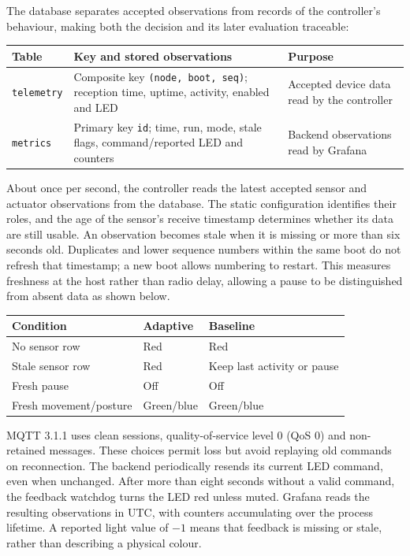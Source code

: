 \documentclass[11pt,a4paper]{article}
\begin{document}
The database separates accepted observations from records of the controller's behaviour, making both the decision and its later evaluation traceable:

{\small
\begin{tabularx}{\linewidth}{@{}lYY@{}}
\toprule
Table & Key and stored observations & Purpose\\
\midrule
\texttt{telemetry} & Composite key \texttt{(node, boot, seq)}; reception time, uptime, activity, enabled and LED & Accepted device data read by the controller\\
\texttt{metrics} & Primary key \texttt{id}; time, run, mode, stale flags, command/reported LED and counters & Backend observations read by Grafana\\
\bottomrule
\end{tabularx}}

About once per second, the controller reads the latest accepted sensor and actuator observations from the database. The static configuration identifies their roles, and the age of the sensor's receive timestamp determines whether its data are still usable. An observation becomes stale when it is missing or more than six seconds old. Duplicates and lower sequence numbers within the same boot do not refresh that timestamp; a new boot allows numbering to restart. This measures freshness at the host rather than radio delay, allowing a pause to be distinguished from absent data as shown below.

\begin{tabularx}{\linewidth}{@{}YYY@{}}
\toprule
Condition & Adaptive & Baseline\\
\midrule
No sensor row & Red & Red\\
Stale sensor row & Red & Keep last activity or pause\\
Fresh pause & Off & Off\\
Fresh movement/posture & Green/blue & Green/blue\\
\bottomrule
\end{tabularx}

MQTT 3.1.1 uses clean sessions, quality-of-service level 0 (QoS 0) and non-retained messages. These choices permit loss but avoid replaying old commands on reconnection. The backend periodically resends its current LED command, even when unchanged. After more than eight seconds without a valid command, the feedback watchdog turns the LED red unless muted. Grafana reads the resulting observations in UTC, with counters accumulating over the process lifetime. A reported light value of $-1$ means that feedback is missing or stale, rather than describing a physical colour.
\end{document}
